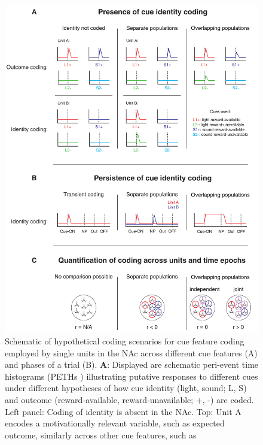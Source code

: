 \documentclass[11pt]{article}
\newcommand{\bsf}[1]{\textbf{#1}}
\providecommand{\DIFadd}[1]{{\protect\color{red} \sf #1}} %
\providecommand{\DIFdel}[1]{} %
\providecommand{\DIFaddFL}[1]{\DIFadd{#1}} %
\providecommand{\DIFdelFL}[1]{\DIFdel{#1}} %
\providecommand{\DIFaddbeginFL}{} %
\providecommand{\DIFaddendFL}{} %
\providecommand{\DIFdelbeginFL}{} %
\providecommand{\DIFdelendFL}{} %
\newcommand{\DIFscaledelfig}{0.5}
\newlength{\DIFdelgraphicswidth} %
\newlength{\DIFdelgraphicsheight} %
\newcommand{\DIFaddincludegraphics}[2][]{{\color{red}\fbox{\DIFOincludegraphics[#1]{#2}}}} %
\newcommand{\DIFdelincludegraphics}[2][]{%
\sbox{\DIFdelgraphicsbox}{\DIFOincludegraphics[#1]{#2}}%
\settoboxwidth{\DIFdelgraphicswidth}{\DIFdelgraphicsbox} %
\settoboxtotalheight{\DIFdelgraphicsheight}{\DIFdelgraphicsbox} %
\scalebox{\DIFscaledelfig}{%
\parbox[b]{\DIFdelgraphicswidth}{\usebox{\DIFdelgraphicsbox}\\[-\baselineskip] \rule{\DIFdelgraphicswidth}{0em}}\llap{\resizebox{\DIFdelgraphicswidth}{\DIFdelgraphicsheight}{%
\setlength{\unitlength}{\DIFdelgraphicswidth}%
\begin{picture}(1,1)%
\thicklines\linethickness{2pt} %
{\color[rgb]{1,0,0}\put(0,0){\framebox(1,1){}}}%
{\color[rgb]{1,0,0}\put(0,0){\line( 1,1){1}}}%
{\color[rgb]{1,0,0}\put(0,1){\line(1,-1){1}}}%
\end{picture}%
}\hspace*{3pt}}} %
} %
\DeclareRobustCommand{\DIFaddbeginFL}{\DIFOaddbeginFL \let\includegraphics\DIFaddincludegraphics} %
\DeclareRobustCommand{\DIFaddendFL}{\DIFOaddendFL \let\includegraphics\DIFOincludegraphics} %
\DeclareRobustCommand{\DIFdelbeginFL}{\DIFOdelbeginFL \let\includegraphics\DIFdelincludegraphics} %
\DeclareRobustCommand{\DIFdelendFL}{\DIFOaddendFL \let\includegraphics\DIFOincludegraphics} %
\begin{document}
 \begin{figure}[ht!]
\centering
\DIFdelbeginFL %
\DIFdelendFL \DIFaddbeginFL \includegraphics[height=0.68\textheight]{Fig 1 - Schematic neural.pdf}
\DIFaddendFL \caption{Schematic of \DIFdelbeginFL \DIFdelFL{potential }\DIFdelendFL \DIFaddbeginFL \DIFaddFL{hypothetical }\DIFaddendFL coding \DIFdelbeginFL \DIFdelFL{strategies }\DIFdelendFL \DIFaddbeginFL \DIFaddFL{scenarios }\DIFaddendFL for cue \DIFdelbeginFL \DIFdelFL{identity
  (light, sound) and cue outcome (reward-available,
  reward-unavailable) }\DIFdelendFL \DIFaddbeginFL \DIFaddFL{feature coding }\DIFaddendFL employed by single units in the NAc across different \DIFdelbeginFL \DIFdelFL{units }\DIFdelendFL \DIFaddbeginFL \DIFaddFL{cue features }\DIFaddendFL (A) and \DIFdelbeginFL \DIFdelFL{in time }\DIFdelendFL \DIFaddbeginFL \DIFaddFL{phases of a trial }\DIFaddendFL (B). \bsf{A}: Displayed are schematic \DIFaddbeginFL \DIFaddFL{peri-event time histograms (}\DIFaddendFL PETHs\DIFaddbeginFL \DIFaddFL{) }\DIFaddendFL illustrating putative responses to different cues under different hypotheses of how cue identity \DIFaddbeginFL \DIFaddFL{(light, sound; L, S) }\DIFaddendFL and outcome \DIFaddbeginFL \DIFaddFL{(reward-available, reward-unavailable; +, -) }\DIFaddendFL are coded. \DIFdelbeginFL \DIFdelFL{H1 (left }\DIFdelendFL \DIFaddbeginFL \DIFaddFL{Left }\DIFaddendFL panel\DIFdelbeginFL \DIFdelFL{)}\DIFdelendFL : Coding of \DIFdelbeginFL \DIFdelFL{cue }\DIFdelendFL identity is absent in the NAc. Top: Unit A encodes a motivationally relevant variable, such as expected outcome, similarly across other cue features, such as \DIFdelbeginFL \DIFdelFL{cue
}}
\end{figure}
\end{document}
